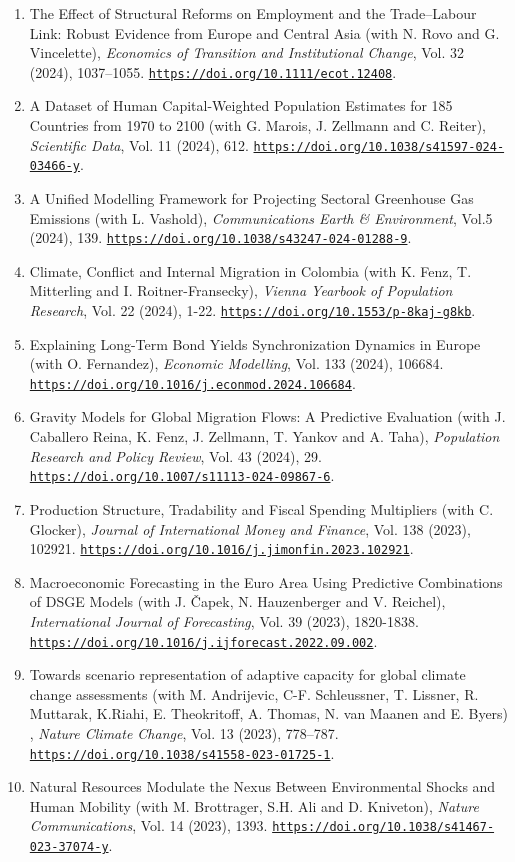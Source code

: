 \documentclass[10pt]{res} %
\newcommand{\doiurl}[1]{\href{https://doi.org/#1}{\nolinkurl{https://doi.org/#1}}}
\begin{document}
\begin{resume}
\begin{enumerate}
\item The Effect of Structural Reforms on Employment and the Trade–Labour Link: Robust Evidence from Europe and Central Asia (with N. Rovo and G. Vincelette), \textit{Economics of Transition and Institutional Change}, Vol. 32 (2024), 1037--1055. \doiurl{10.1111/ecot.12408}.
\item A Dataset of Human Capital-Weighted Population Estimates for 185 Countries from 1970 to 2100 (with G. Marois, J. Zellmann and C. Reiter), \textit{Scientific Data}, Vol. 11 (2024), 612. \doiurl{10.1038/s41597-024-03466-y}.
\item A Unified Modelling Framework for Projecting Sectoral Greenhouse Gas Emissions (with L. Vashold), \textit{Communications Earth \& Environment}, Vol.5 (2024), 139. \doiurl{10.1038/s43247-024-01288-9}.
\item Climate, Conflict and Internal Migration in Colombia (with K. Fenz, T. Mitterling and I. Roitner-Fransecky), \textit{Vienna Yearbook of Population Research}, Vol. 22 (2024), 1-22. \doiurl{10.1553/p-8kaj-g8kb}.
\item Explaining Long-Term Bond Yields Synchronization Dynamics in Europe (with O. Fernandez), \textit{Economic Modelling}, Vol. 133 (2024), 106684. \doiurl{10.1016/j.econmod.2024.106684}.
\item Gravity Models for Global Migration Flows: A Predictive Evaluation (with   J. Caballero Reina, K. Fenz, J. Zellmann, T. Yankov and A. Taha), \textit{Population Research and Policy Review}, Vol. 43 (2024), 29. \doiurl{10.1007/s11113-024-09867-6}.
\item Production Structure, Tradability and Fiscal Spending Multipliers (with C. Glocker), \textit{Journal of International Money and Finance}, Vol. 138 (2023), 102921. \doiurl{10.1016/j.jimonfin.2023.102921}.
\item Macroeconomic Forecasting in the Euro Area Using Predictive Combinations of DSGE Models (with J. \v{C}apek, N. Hauzenberger and V. Reichel), \textit{International Journal of Forecasting}, Vol. 39 (2023), 1820-1838. \doiurl{10.1016/j.ijforecast.2022.09.002}.
\item Towards scenario representation of adaptive capacity for global climate change assessments (with M. Andrijevic, C-F. Schleussner, T. Lissner, R. Muttarak, K.Riahi, E. Theokritoff, A. Thomas, N. van Maanen and E. Byers) , \textit{Nature Climate Change}, Vol. 13 (2023), 778–787. \doiurl{10.1038/s41558-023-01725-1}.
\item Natural Resources Modulate the Nexus Between Environmental Shocks and Human Mobility (with M. Brottrager, S.H. Ali and D. Kniveton), \textit{Nature Communications}, Vol. 14 (2023), 1393. \doiurl{10.1038/s41467-023-37074-y}.

\end{enumerate}
\end{resume}
\end{document}
